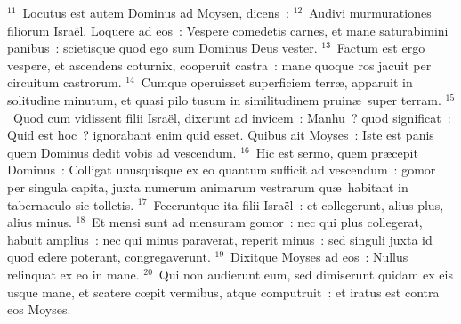 ${}^{11}$~Locutus est autem Dominus ad Moysen, dicens~:
${}^{12}$~Audivi murmurationes filiorum Isra\"el. Loquere ad eos~: Vespere comedetis carnes, et mane saturabimini panibus~: scietisque quod ego sum Dominus Deus vester.
${}^{13}$~Factum est ergo vespere, et ascendens coturnix, cooperuit castra~: mane quoque ros jacuit per circuitum castrorum.
${}^{14}$~Cumque operuisset superficiem terr\ae , apparuit in solitudine minutum, et quasi pilo tusum in similitudinem pruin\ae\ super terram.
${}^{15}$~Quod cum vidissent filii Isra\"el, dixerunt ad invicem~: Manhu~? quod significat~: Quid est hoc~? ignorabant enim quid esset. Quibus ait Moyses~: Iste est panis quem Dominus dedit vobis ad vescendum.
${}^{16}$~Hic est sermo, quem pr\ae cepit Dominus~: Colligat unusquisque ex eo quantum sufficit ad vescendum~: gomor per singula capita, juxta numerum animarum vestrarum qu\ae\ habitant in tabernaculo sic tolletis.
${}^{17}$~Feceruntque ita filii Isra\"el~: et collegerunt, alius plus, alius minus.
${}^{18}$~Et mensi sunt ad mensuram gomor~: nec qui plus collegerat, habuit amplius~: nec qui minus paraverat, reperit minus~: sed singuli juxta id quod edere poterant, congregaverunt.
${}^{19}$~Dixitque Moyses ad eos~: Nullus relinquat ex eo in mane.
${}^{20}$~Qui non audierunt eum, sed dimiserunt quidam ex eis usque mane, et scatere cœpit vermibus, atque computruit~: et iratus est contra eos Moyses.


